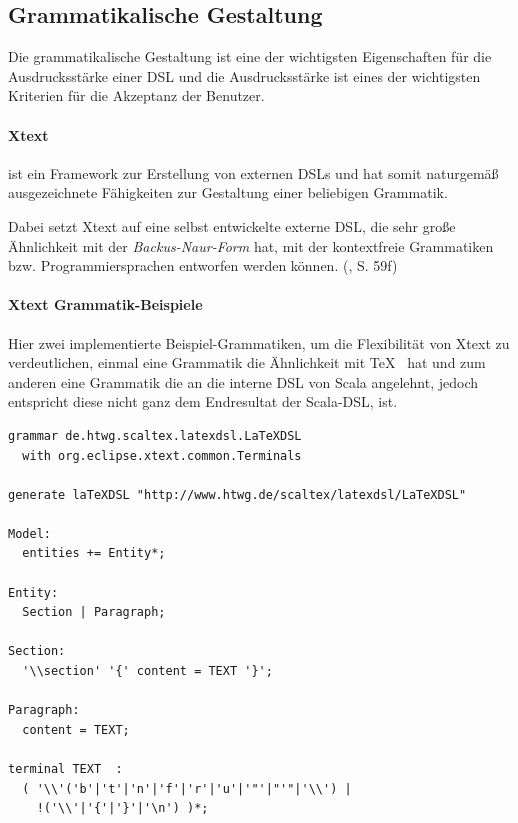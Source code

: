 \subsection{Grammatikalische Gestaltung}\label{sec-grammatikGestaltung}

Die grammatikalische Gestaltung ist eine der wichtigsten Eigenschaften
für die Ausdrucksstärke einer DSL und die Ausdrucksstärke ist eines
der wichtigsten Kriterien für die Akzeptanz der Benutzer.

\paragraph{Xtext} ist ein Framework zur Erstellung von externen DSLs und
hat somit naturgemäß ausgezeichnete Fähigkeiten zur Gestaltung einer beliebigen
Grammatik.

Dabei setzt Xtext auf eine selbst entwickelte externe DSL, die sehr große
Ähnlichkeit mit der \emph{Backus-Naur-Form} hat, mit der kontextfreie
Grammatiken bzw. Programmiersprachen entworfen werden können.
(\cite{xtext}, S. 59f)

\paragraph{Xtext Grammatik-Beispiele}

Hier zwei implementierte Beispiel-Grammatiken, um die Flexibilität von
Xtext zu verdeutlichen, einmal eine Grammatik die Ähnlichkeit mit \TeX~
hat und zum anderen eine Grammatik die an die interne DSL von Scala angelehnt,
jedoch entspricht diese nicht ganz dem Endresultat der Scala-DSL, ist.

\begin{lstlisting}[caption=\TeX-ähnliches Xtext-Grammatik-Snippet.]
grammar de.htwg.scaltex.latexdsl.LaTeXDSL
  with org.eclipse.xtext.common.Terminals

generate laTeXDSL "http://www.htwg.de/scaltex/latexdsl/LaTeXDSL"

Model:
  entities += Entity*;

Entity:
  Section | Paragraph;

Section:
  '\\section' '{' content = TEXT '}';

Paragraph:
  content = TEXT;

terminal TEXT  : 
  ( '\\'('b'|'t'|'n'|'f'|'r'|'u'|'"'|"'"|'\\') |
    !('\\'|'{'|'}'|'\n') )*;
\end{lstlisting}

